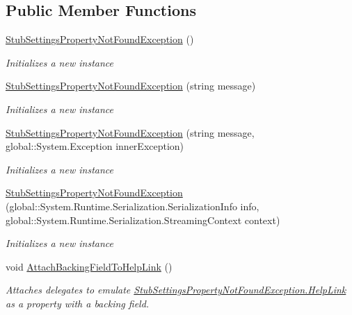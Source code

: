 \subsection*{Public Member Functions}
\begin{DoxyCompactItemize}
\item 
\hyperlink{class_system_1_1_configuration_1_1_fakes_1_1_stub_settings_property_not_found_exception_a90f25b613b727f123a02880513c280fc}{Stub\-Settings\-Property\-Not\-Found\-Exception} ()
\begin{DoxyCompactList}\small\item\em Initializes a new instance\end{DoxyCompactList}\item 
\hyperlink{class_system_1_1_configuration_1_1_fakes_1_1_stub_settings_property_not_found_exception_a517462b1b907b8b1de61a157cf72fca2}{Stub\-Settings\-Property\-Not\-Found\-Exception} (string message)
\begin{DoxyCompactList}\small\item\em Initializes a new instance\end{DoxyCompactList}\item 
\hyperlink{class_system_1_1_configuration_1_1_fakes_1_1_stub_settings_property_not_found_exception_a9d35d3115206c540a974eaeb7827b310}{Stub\-Settings\-Property\-Not\-Found\-Exception} (string message, global\-::\-System.\-Exception inner\-Exception)
\begin{DoxyCompactList}\small\item\em Initializes a new instance\end{DoxyCompactList}\item 
\hyperlink{class_system_1_1_configuration_1_1_fakes_1_1_stub_settings_property_not_found_exception_a74908d944e34bc2ef52eb4f5203121f8}{Stub\-Settings\-Property\-Not\-Found\-Exception} (global\-::\-System.\-Runtime.\-Serialization.\-Serialization\-Info info, global\-::\-System.\-Runtime.\-Serialization.\-Streaming\-Context context)
\begin{DoxyCompactList}\small\item\em Initializes a new instance\end{DoxyCompactList}\item 
void \hyperlink{class_system_1_1_configuration_1_1_fakes_1_1_stub_settings_property_not_found_exception_a99ef5adc96f85bc083559c0a94f7a8f8}{Attach\-Backing\-Field\-To\-Help\-Link} ()
\begin{DoxyCompactList}\small\item\em Attaches delegates to emulate \hyperlink{class_system_1_1_configuration_1_1_fakes_1_1_stub_settings_property_not_found_exception_a860b0c2d425ab5afc46f92a4c789bb94}{Stub\-Settings\-Property\-Not\-Found\-Exception.\-Help\-Link} as a property with a backing field.\end{DoxyCompactList}\item 

\end{DoxyCompactItemize}

